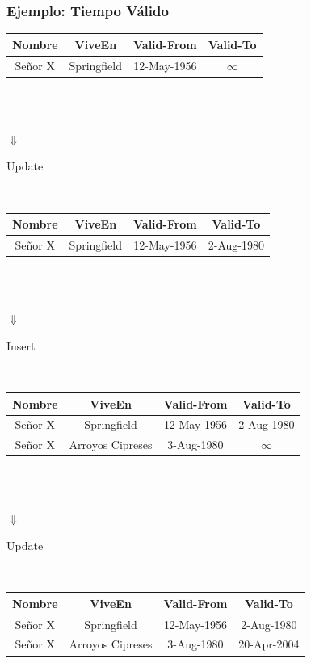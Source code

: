 \documentclass[a4paper,12pt,oneside]{report}
\begin{document}
\subsubsection*{Ejemplo: Tiempo V\'alido}
\begin{center}
\begin{tabular}{|c|c|c|c|}
\hline
Nombre & ViveEn & Valid-From & Valid-To\\
\hline
Se\~nor X & Springfield & 12-May-1956 & $\infty$\\
\hline
\end{tabular}
\\
\ \\
\begin{Huge}{$\Downarrow$}\end{Huge}\begin{small}{Update}\end{small}\\
\begin{tabular}{|c|c|c|c|}
\hline
Nombre & ViveEn & Valid-From & Valid-To\\
\hline
Se\~nor X & Springfield & 12-May-1956 & 2-Aug-1980\\
\hline
\end{tabular}
\\
\ \\
\begin{Huge}{$\Downarrow$}\end{Huge}\begin{small}{Insert}\end{small}\\
\begin{tabular}{|c|c|c|c|}
\hline
Nombre & ViveEn & Valid-From & Valid-To\\
\hline
Se\~nor X & Springfield & 12-May-1956 & 2-Aug-1980\\
\hline
Se\~nor X & Arroyos Cipreses & 3-Aug-1980 & $\infty$\\
\hline
\end{tabular}
\\
\ \\
\begin{Huge}{$\Downarrow$}\end{Huge}\begin{small}{Update}\end{small}\\
\begin{tabular}{|c|c|c|c|}
\hline
Nombre & ViveEn & Valid-From & Valid-To\\
\hline
Se\~nor X & Springfield & 12-May-1956 & 2-Aug-1980\\
\hline
Se\~nor X & Arroyos Cipreses & 3-Aug-1980 & 20-Apr-2004\\
\hline
\end{tabular}

\end{center}
\end{document}
